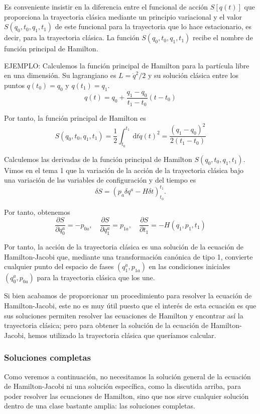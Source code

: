 Es conveniente insistir en la diferencia entre el funcional de acción $S[q(t)]$ que proporciona la trayectoria clásica mediante un principio variacional y el valor $S\left(q_{0}, t_{0}, q_{1}, t_{1}\right)$ de este funcional para la trayectoria que lo hace estacionario, es decir, para la trayectoria clásica. La función $S\left(q_{0}, t_{0}, q_{1}, t_{1}\right)$ recibe el nombre de función principal de Hamilton.

EJEMPLO: Calculemos la función principal de Hamilton para la partícula libre en una dimensión. Su lagrangiano es $L=\dot{q}^{2} / 2$ y su solución clásica entre los puntos $q\left(t_{0}\right)=q_{0}$ y $q\left(t_{1}\right)=q_{1}$.
$$
q(t)=q_{0}+\frac{q_{1}-q_{0}}{t_{1}-t_{0}}\left(t-t_{0}\right)
$$

Por tanto, la función principal de Hamilton es
$$
S\left(q_{0}, t_{0}, q_{1}, t_{1}\right)=\frac{1}{2} \int_{t_{0}}^{t_{1}} \mathrm{~d} t \dot{q}(t)^{2}=\frac{\left(q_{1}-q_{0}\right)^{2}}{2\left(t_{1}-t_{0}\right)}
$$

Calculemos las derivadas de la función principal de Hamilton $S\left(q_{0}, t_{0}, q_{1}, t_{1}\right)$. Vimos en el tema 1 que la variación de la acción de la trayectoria clásica bajo
una variación de las variables de configuración y del tiempo es
$$
\delta S=\left(p_{a} \delta q^{a}-H \delta t\right)_{t_{0}}^{t_{1}} .
$$

Por tanto, obtenemos
$$
\frac{\partial S}{\partial q_{0}^{a}}=-p_{0 a}, \quad \frac{\partial S}{\partial q_{1}^{a}}=p_{1 a}, \quad \frac{\partial S}{\partial t_{1}}=-H\left(q_{1}, p_{1}, t_{1}\right)
$$

Por tanto, la acción de la trayectoria clásica es una solución de la ecuación de Hamilton-Jacobi que, mediante una transformación canónica de tipo 1, convierte cualquier punto del espacio de fases $\left(q_{1}^{a}, p_{1 a}\right)$ en las condiciones iniciales $\left(q_{0}^{a}, p_{0 a}\right)$ para la trayectoria clásica que los une.

Si bien acabamos de proporcionar un procedimiento para resolver la ecuación de Hamilton-Jacobi, este no es muy útil puesto que el interés de esta ecuación es que sus soluciones permiten resolver las ecuaciones de Hamilton y encontrar así la trayectoria clásica; pero para obtener la solución de la ecuación de Hamilton-Jacobi, hemos utilizado la trayectoria clásica que queríamos calcular.
\subsubsection{Soluciones completas}
Como veremos a continuación, no necesitamos la solución general de la ecuación de Hamilton-Jacobi ni una solución específica, como la discutida arriba, para poder resolver las ecuaciones de Hamilton, sino que nos sirve cualquier solución dentro de una clase bastante amplia: las soluciones completas.

